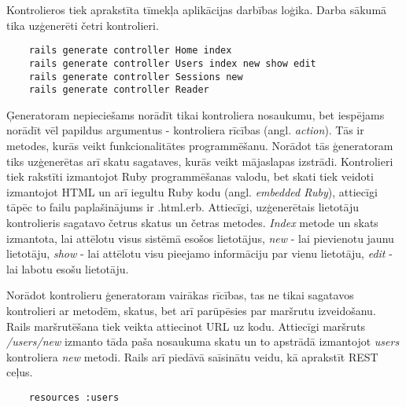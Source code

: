 Kontrolieros tiek aprakstīta tīmekļa aplikācijas darbības loģika. Darba sākumā tika uzģenerēti četri kontrolieri.
\begin{lstlisting}
	rails generate controller Home index
	rails generate controller Users index new show edit
	rails generate controller Sessions new
	rails generate controller Reader
\end{lstlisting}
Ģeneratoram nepieciešams norādīt tikai kontroliera nosaukumu, bet iespējams norādīt vēl papildus argumentus - kontroliera rīcības (angl. \textit{action}). Tās ir metodes, kurās veikt funkcionalitātes programmēšanu. Norādot tās ģeneratoram tiks uzģenerētas arī skatu sagataves, kurās veikt mājaslapas izstrādi. Kontrolieri tiek rakstīti izmantojot Ruby programmēšanas valodu, bet skati tiek veidoti izmantojot HTML un arī iegultu Ruby kodu (angl. \textit{embedded Ruby}), attiecīgi tāpēc to failu paplašinājums ir .html.erb. Attiecīgi, uzģenerētais lietotāju kontrolieris sagatavo četrus skatus un četras metodes. \textit{Index} metode un skats izmantota, lai attēlotu visus sistēmā esošos lietotājus, \textit{new} - lai pievienotu jaunu lietotāju, \textit{show} - lai attēlotu visu pieejamo informāciju par vienu lietotāju, \textit{edit} - lai labotu esošu lietotāju.

Norādot kontrolieru ģeneratoram vairākas rīcības, tas ne tikai sagatavos kontrolieri ar metodēm, skatus, bet arī parūpēsies par maršrutu izveidošanu. Rails maršrutēšana tiek veikta attiecinot URL uz kodu. Attiecīgi maršruts \textit{/users/new} izmanto tāda paša nosaukuma skatu un to apstrādā izmantojot \textit{users} kontroliera \textit{new} metodi. Rails arī piedāvā saīsinātu veidu, kā aprakstīt REST ceļus.
\begin{lstlisting}
	resources :users
\end{lstlisting}

